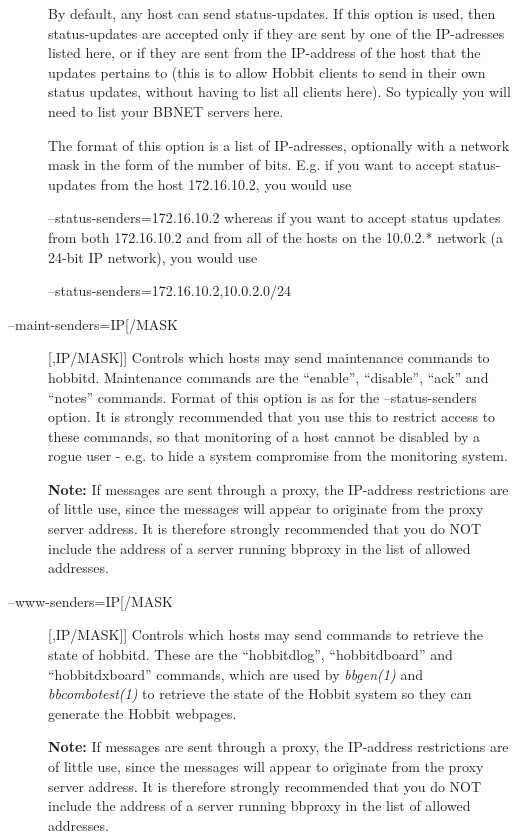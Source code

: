 \begin{description}
  By default, any host can send status-updates. If this option is used, then status-updates are accepted only if they are sent by one of the IP-adresses listed here, or if they are sent from the IP-address of the host that the updates pertains to (this is to allow Hobbit clients to send in their own status updates, without having to list all clients here). So typically you will need to list your BBNET servers here. 


  The format of this option is a list of IP-adresses, optionally with a network mask in the form of the number of bits. E.g. if you want to accept status-updates from the host 172.16.10.2, you would use  
 
--status-senders=172.16.10.2  
 whereas if you want to accept status updates from both 172.16.10.2 and from all of the hosts on the 10.0.2.* network (a 24-bit IP network), you would use  
 
--status-senders=172.16.10.2,10.0.2.0/24 


 

\item[--maint-senders=IP[/MASK][,IP/MASK]] Controls which hosts may send maintenance commands to hobbitd. Maintenance commands are the ``enable'', ``disable'', ``ack'' and ``notes'' commands. Format of this option is as for the --status-senders option. It is strongly recommended that you use this to restrict access to these commands, so that monitoring of a host cannot be disabled by a rogue user - e.g. to hide a system compromise from the monitoring system. 

 \textbf{Note:}
 If messages are sent through a proxy, the IP-address restrictions are of little use, since the messages will appear to originate from the proxy server address. It is therefore strongly recommended that you do NOT include the address of a server running bbproxy in the list of allowed addresses. 


 

\item[--www-senders=IP[/MASK][,IP/MASK]] Controls which hosts may send commands to retrieve the state of hobbitd. These are the ``hobbitdlog'', ``hobbitdboard'' and ``hobbitdxboard'' commands, which are used by \emph{bbgen(1)}
 and \emph{bbcombotest(1)}
 to retrieve the state of the Hobbit system so they can generate the Hobbit webpages. 

 \textbf{Note:}
 If messages are sent through a proxy, the IP-address restrictions are of little use, since the messages will appear to originate from the proxy server address. It is therefore strongly recommended that you do NOT include the address of a server running bbproxy in the list of allowed addresses. 



\end{description}
